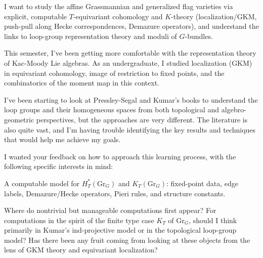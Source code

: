 \documentclass[12pt]{article}
\begin{document}
I want to study the affine Grassmannian and generalized flag varieties via explicit, computable $T$-equivariant cohomology and $K$-theory (localization/GKM, push-pull along Hecke correspondences, Demazure operators), and understand the links to loop-group representation theory and moduli of $G$-bundles.

This semester, I've been getting more comfortable with the representation theory of Kac-Moody Lie algebras. As an undergraduate, I studied localization (GKM) in equivariant cohomology, image of restriction to fixed points, and the combinatorics of the moment map in this context.

I've been starting to look at Pressley-Segal and Kumar's books to understand the loop groups and their homogeneous spaces from both topological and algebro-geometric perspectives, but the approaches are very different. The literature is also quite vast, and I'm having trouble identifying the key results and techniques that would help me achieve my goals.

I wanted your feedback on how to approach this learning process, with the following specific interests in mind:

A computable model for $H_T^*(\mathrm{Gr}_G)$ and $K_T(\mathrm{Gr}_G)$: fixed-point data, edge labels, Demazure/Hecke operators, Pieri rules, and structure constants.

Where do nontrivial but manageable computations first appear? For computations in the spirit of the finite type case $K_T$ of $\mathrm{Gr}_G$, should I think primarily in Kumar's ind-projective model or in the topological loop-group model? Has there been any fruit coming from looking at these objects from the lens of GKM theory and equivariant localization?
\end{document}
